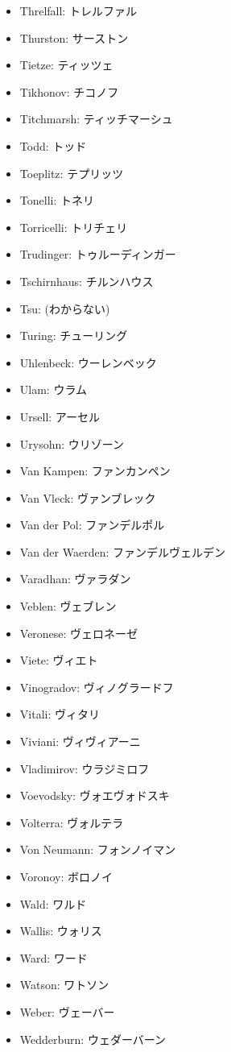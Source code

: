 \documentclass[openany, a4paper, oneside]{jsbook}
\begin{document}
\begin{itemize}
\item Threlfall: トレルファル
\item Thurston: サーストン
\item Tietze: ティッツェ
\item Tikhonov: チコノフ
\item Titchmarsh: ティッチマーシュ
\item Todd: トッド
\item Toeplitz: テプリッツ
\item Tonelli: トネリ
\item Torricelli: トリチェリ
\item Trudinger: トゥルーディンガー
\item Tschirnhaus: チルンハウス
\item Tsu: (わからない)
\item Turing: チューリング
\item Uhlenbeck: ウーレンベック
\item Ulam: ウラム
\item Ursell: アーセル
\item Urysohn: ウリゾーン
\item Van Kampen: ファンカンペン
\item Van Vleck: ヴァンブレック
\item Van der Pol: ファンデルポル
\item Van der Waerden: ファンデルヴェルデン
\item Varadhan: ヴァラダン
\item Veblen: ヴェブレン
\item Veronese: ヴェロネーゼ
\item Viete: ヴィエト
\item Vinogradov: ヴィノグラードフ
\item Vitali: ヴィタリ
\item Viviani: ヴィヴィアーニ
\item Vladimirov: ウラジミロフ
\item Voevodsky: ヴォエヴォドスキ
\item Volterra: ヴォルテラ
\item Von Neumann: フォンノイマン
\item Voronoy: ボロノイ
\item Wald: ワルド
\item Wallis: ウォリス
\item Ward: ワード
\item Watson: ワトソン
\item Weber: ヴェーバー
\item Wedderburn: ウェダーバーン

\end{itemize}
\end{document}
